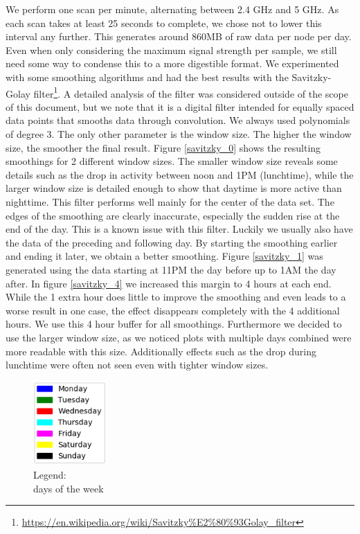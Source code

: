 \documentclass[a4paper, 11pt]{article}
\begin{document}
We perform one scan per minute, alternating between 2.4 GHz and 5 GHz. As each scan takes at least 25 seconds to complete, we chose not to lower this interval any further. This generates around 860MB of raw data per node per day. Even when only considering the maximum signal strength per sample, we still need some way to condense this to a more digestible format. We experimented with some smoothing algorithms and had the best results with the Savitzky-Golay filter\footnote{\url{https://en.wikipedia.org/wiki/Savitzky\%E2\%80\%93Golay_filter}}. A detailed analysis of the filter was considered outside of the scope of this document, but we note that it is a digital filter intended for equally spaced data points that smooths data through convolution. We always used polynomials of degree 3. The only other parameter is the window size. The higher the window size, the smoother the final result. Figure \ref{savitzky_0} shows the resulting smoothings for 2 different window sizes. The smaller window size reveals some details such as the drop in activity between noon and 1PM (lunchtime), while the larger window size is detailed enough to show that daytime is more active than nighttime. This filter performs well mainly for the center of the data set. The edges of the smoothing are clearly inaccurate, especially the sudden rise at the end of the day. This is a known issue with this filter. Luckily we usually also have the data of the preceding and following day. By starting the smoothing earlier and ending it later, we obtain a better smoothing. Figure \ref{savitzky_1} was generated using the data starting at 11PM the day before up to 1AM the day after. In figure \ref{savitzky_4} we increased this margin to 4 hours at each end. While the 1 extra hour does little to improve the smoothing and even leads to a worse result in one case, the effect disappears completely with the 4 additional hours. We use this 4 hour buffer for all smoothings. Furthermore we decided to use the larger window size, as we noticed plots with multiple days combined were more readable with this size. Additionally effects such as the drop during lunchtime were often not seen even with tighter window sizes.\\
\begin{figure}
\centering
\captionsetup{justification=centering}
\includegraphics[width=0.25\textwidth]{legend.png}
\caption{Legend:\\ days of the week}
\label{legend}
\end{figure}
\end{document}
